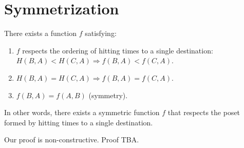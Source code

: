 \section{Symmetrization}
\begin{theorem} There exists a function $f$ satisfying:
\begin{enumerate}
\item $f$ respects the ordering of hitting times to a single
destination: $H(B, A) < H(C, A) \Rightarrow f(B, A) < f(C,A)$.
\item $H(B, A) = H(C, A) \Rightarrow f(B, A) = f(C,A)$.
\item $f(B, A) = f(A,B)$ (symmetry).
\end{enumerate}
In other words, there exists a symmetric function $f$ that
respects the poset formed by hitting times to a single
destination.
\end{theorem}
Our proof is non-constructive. Proof TBA.
